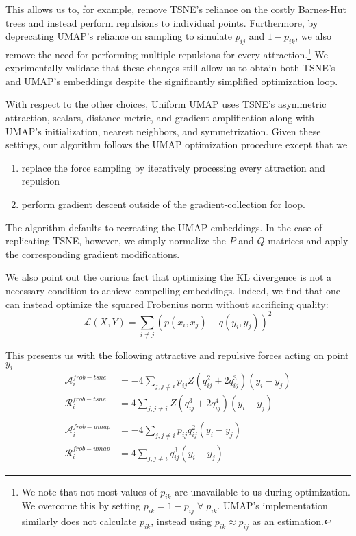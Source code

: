 \documentclass[sigconf, nonacm]{acmart}
\newcommand\ourmethod{Uniform UMAP }
\begin{document}
This allows us to, for example, remove TSNE's reliance on the costly Barnes-Hut trees and instead perform repulsions to individual points.
Furthermore, by deprecating UMAP's reliance on sampling to simulate $p_{ij}$ and $1 - p_{ik}$, we also remove the need for performing multiple repulsions for every
attraction.\footnote{We note that not most values of $p_{ik}$ are unavailable to us during optimization. We overcome this by setting $p_{ik} = 1 - \bar{p}_{ij}
\; \forall \; p_{ik}$. UMAP's implementation similarly does not calculate $p_{ik}$, instead using $p_{ik} \approx p_{ij}$ as an estimation.} We exprimentally
validate that these changes still allow us to obtain both TSNE's and UMAP's embeddings despite the significantly simplified optimization loop.

With respect to the other choices, \ourmethod uses TSNE's asymmetric attraction, scalars, distance-metric, and gradient amplification along with UMAP's
initialization, nearest neighbors, and symmetrization. Given these settings, our algorithm follows the UMAP optimization procedure except that we
\begin{enumerate}
        \item replace the force sampling by iteratively processing every attraction and repulsion
        \item perform gradient descent outside of the gradient-collection for loop.
\end{enumerate}
The algorithm defaults to recreating the UMAP embeddings. In the case of replicating TSNE, however, we simply normalize the $P$ and $Q$ matrices and apply the
corresponding gradient modifications.

We also point out the curious fact that optimizing the KL divergence is not a necessary condition to achieve compelling embeddings. Indeed, we find that one can
instead optimize the squared Frobenius norm without sacrificing quality:
\[ \mathcal{L}(X, Y) = \sum_{i \neq j} (p(x_i, x_j) - q(y_i, y_j))^2 \]

This presents us with the following attractive and repulsive forces acting on point $y_i$
\begin{align*}
    \mathcal{A}_i^{frob-tsne} &= -4 \sum_{j, j \neq i} p_{ij} Z (q_{ij}^2 + 2q_{ij}^3) (y_i - y_j) \\
    \mathcal{R}_i^{frob-tsne} &= 4 \sum_{j, j \neq i} Z( q_{ij}^3 + 2q_{ij}^4) (y_i - y_j) \\
    &\\
    \mathcal{A}_i^{frob-umap} &= -4 \sum_{j, j \neq i} p_{ij} q_{ij}^2 (y_i - y_j) \\
    \mathcal{R}_i^{frob-umap} &= 4 \sum_{j, j \neq i} q_{ij}^3 (y_i - y_j)  
\end{align*}
\end{document}
